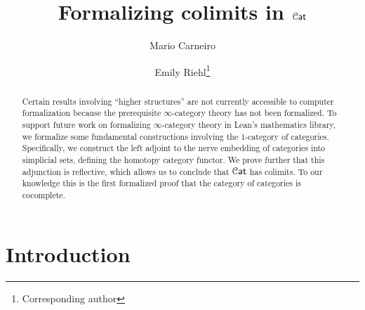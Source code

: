\documentclass[a4paper,UKenglish,cleveref, autoref, thm-restate]{lipics-v2021}
\title{Formalizing colimits in $\Cat$}
\author{Mario Carneiro}{Chalmers University of Technology, Sweden} {marioc@chalmers.se}{https://orcid.org/0000-0002-0470-5249}{}%
\author{Emily Riehl\footnote{Corresponding author}}{Department of Mathematics, Johns Hopkins University, 3400 N Charles Street, Baltimore, MD, USA }{eriehl@jhu.edu}{https://orcid.org/0000-0002-8465-8859}{NSF DMS-1652600, AFOSR FA9550-21-1-0009, ARO W911NF-20-1-0082}
\newcommand{\cat}[1]{\textup{\textsf{#1}}}%
\newcommand{\1}{\mathbbe{1}}
\newcommand{\2}{\mathbbe{2}}
\newcommand{\3}{\mathbbe{3}}
\newcommand{\Cat}{\mathcal{C}\cat{at}}
\begin{document}
\maketitle

\begin{abstract}
  Certain results involving ``higher structures'' are not currently accessible to computer formalization because the prerequisite $\infty$-category theory has not been formalized. To support future work on formalizing $\infty$-category theory in Lean's mathematics library, we formalize some fundamental constructions involving the 1-category of categories. Specifically, we construct the left adjoint to the nerve embedding of categories into simplicial sets, defining the homotopy category functor. We prove further that this adjunction is reflective, which allows us to conclude that $\Cat$ has colimits. To our knowledge this is the first formalized proof that the category of categories is cocomplete.




\end{abstract}

\maketitle

\newpage
\tableofcontents

\newpage
\section{Introduction}
\end{document}
